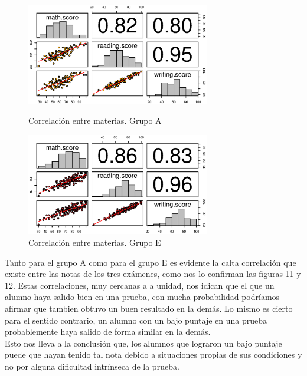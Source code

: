 \documentclass{article}
\begin{document}
    \begin{figure}[H]
        \begin{minipage}[b]{0.45\linewidth}
            \includegraphics[width=8cm]{Output/Plots/5CorrgrupoA.eps}
            \vspace*{-8.5mm}
            \caption{Correlaci\'on entre materias. Grupo A}
            \label{fig:minipage1}
        \end{minipage}
        \hspace{0.2cm}
        \begin{minipage}[b]{0.45\linewidth}
            \includegraphics[width=8cm]{Output/Plots/6CorrelaciongrupoE.eps}
            \vspace*{-9mm}
            \caption{Correlaci\'on entre materias. Grupo E}
            \label{fig:minipage2}
        \end{minipage}
    \end{figure}
    \newpage
    Tanto para el grupo A como para el grupo E es evidente la calta correlaci\'on que existe entre las notas de los tres ex\'amenes,
     como nos lo confirman las figuras 11 y 12. Estas correlaciones, muy cercanas a a unidad, nos idican que el que un alumno haya salido
     bien en una prueba, con mucha probabilidad podr\'iamos afirmar que tambien obtuvo un buen resultado en la dem\'as. Lo mismo
     es cierto para el sentido contrario, un alumno con un bajo puntaje en una prueba probablemente haya salido de forma similar en la dem\'as.\\

     Esto nos lleva a la conclusi\'on que, los alumnos que lograron un bajo puntaje puede que hayan tenido tal nota debido a
     situaciones propias de sus condiciones y no por alguna dificultad intr\'inseca de la prueba.
\end{document}
